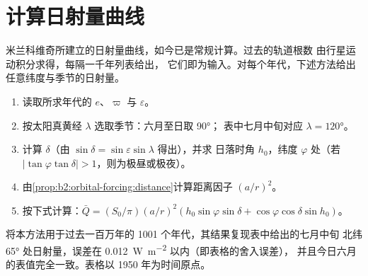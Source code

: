\section{计算日射量曲线}\label{sec:b2:orbital-forcing:curve}

米兰科维奇所建立的日射量曲线，如今已是常规计算。过去的轨道根数
由行星运动积分求得，每隔一千年列表给出，
它们即为输入。对每个年代，下述方法给出任意纬度与季节的日射量。

\begin{method}[过去的日射量]\label{met:b2:orbital-forcing:curve}
\begin{enumerate}
  \item 读取所求年代的 $e$、$\varpi$ 与 $\varepsilon$。
  \item 按太阳真黄经 $\lambda$ 选取季节：六月至日取 \ang{90}；
        表中七月中旬对应 $\lambda = \ang{120}$。
  \item 计算 $\delta$（由 $\sin\delta = \sin\varepsilon\sin\lambda$ 得出），并求
        日落时角 $h_0$，纬度 $\varphi$ 处（若 $|\tan\varphi\tan\delta| > 1$，则为极昼或极夜）。
  \item 由\cref{prop:b2:orbital-forcing:distance}计算距离因子 $(a/r)^2$。
  \item 按下式计算：$\bar Q = (S_0/\pi)(a/r)^2(h_0\sin\varphi\sin\delta +
        \cos\varphi\cos\delta\sin h_0)$。
\end{enumerate}
\end{method}

将本方法用于过去一百万年的 1001 个年代，其结果复现表中给出的七月中旬
北纬 \ang{65} 处日射量，误差在 \qty{0.012}{W.m^{-2}} 以内（即表格的舍入误差），
并且今日六月的表值完全一致。表格以 1950 年为时间原点。

